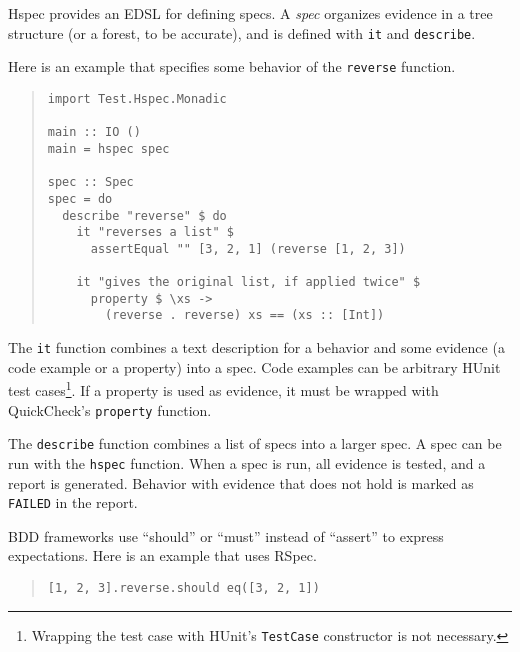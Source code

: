 \documentclass[preprint]{sigplanconf}
\begin{document}
Hspec provides an EDSL for defining specs.  A \emph{spec} organizes evidence
in a tree structure (or a forest, to be accurate), and is defined
with \texttt{it} and \texttt{describe}.

Here is an example that specifies some behavior of the {\tt reverse}
function.

\begin{quote}
\small
\begin{verbatim}
import Test.Hspec.Monadic

main :: IO ()
main = hspec spec

spec :: Spec
spec = do
  describe "reverse" $ do
    it "reverses a list" $
      assertEqual "" [3, 2, 1] (reverse [1, 2, 3])

    it "gives the original list, if applied twice" $
      property $ \xs ->
        (reverse . reverse) xs == (xs :: [Int])
\end{verbatim}
\end{quote}

\noindent The {\tt it} function combines a text description for a
behavior and some evidence (a code example or a property) into a spec.
Code examples can be arbitrary HUnit test cases\footnote{%
Wrapping the test case with HUnit's {\tt TestCase} constructor is not
necessary.}.  If a property is used as evidence, it must be wrapped
with QuickCheck's {\tt property} function.

The \texttt{describe} function combines a list of specs into a larger spec.
A spec can be run with the \texttt{hspec} function.  When a spec is
run, all evidence is tested, and a report is generated.  Behavior with
evidence that does not hold is marked as {\tt FAILED} in the
report.

BDD frameworks use ``should'' or ``must'' instead of
``assert'' to express expectations.  Here is an example that uses
RSpec.

\begin{quote}
\small
\begin{verbatim}
[1, 2, 3].reverse.should eq([3, 2, 1])
\end{verbatim}
\end{quote}
\end{document}
